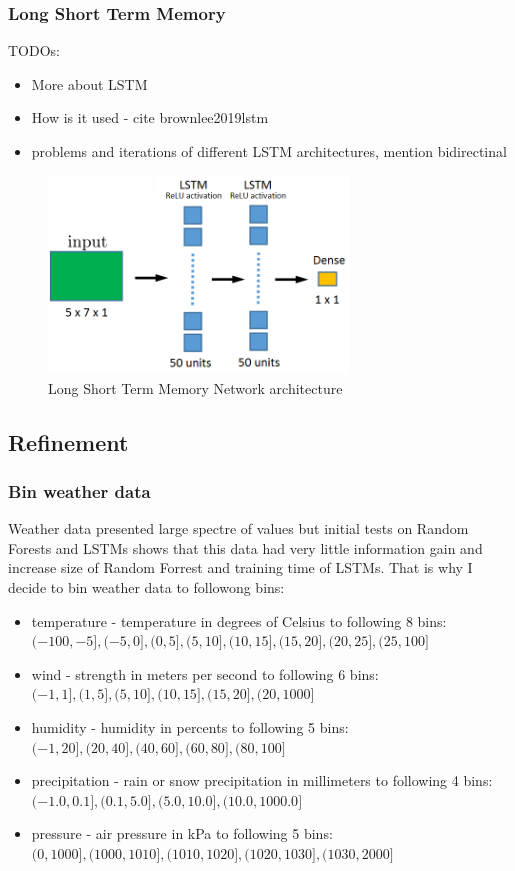 \documentclass{article}
\begin{document}
\subsubsection{Long Short Term Memory}

\color{red}
TODOs:
\begin{itemize}
    \item More about LSTM
    \item How is it used - cite brownlee2019lstm
    \item problems and iterations of different LSTM architectures, mention bidirectinal
\end{itemize}
\color{black}

\begin{figure}[h!]
\centering
\includegraphics[width=8cm]{imgs/lstm.png}
\caption{Long Short Term Memory Network architecture}
\label{fig:lstm}
\end{figure}

\subsection{Refinement}
\subsubsection{Bin weather data}
Weather data presented large spectre of values but initial tests on Random Forests and LSTMs shows that this data had very little information gain and increase size of Random Forrest and training time of LSTMs. That is why I decide to bin weather data to followong bins:
\begin{itemize}
    \item temperature - temperature in degrees of Celsius to following 8 bins: $(-100, -5], (-5,0], (0,5], (5,10], (10,15], (15,20], (20,25], (25, 100]$
    \item wind - strength in meters per second to following 6 bins: $(-1,1], (1,5], (5,10], (10,15], (15,20], (20, 1000]$
    \item humidity - humidity in percents to following 5 bins: $(-1,20], (20,40], (40,60], (60,80], (80,100]$
    \item precipitation - rain or snow precipitation in millimeters to following 4 bins: $(-1.0,0.1], (0.1,5.0], (5.0,10.0], (10.0,1000.0]$
    \item pressure - air pressure in kPa to following 5 bins: $(0,1000], (1000,1010], (1010,1020], (1020,1030], (1030,2000]$
\end{itemize}
\end{document}
